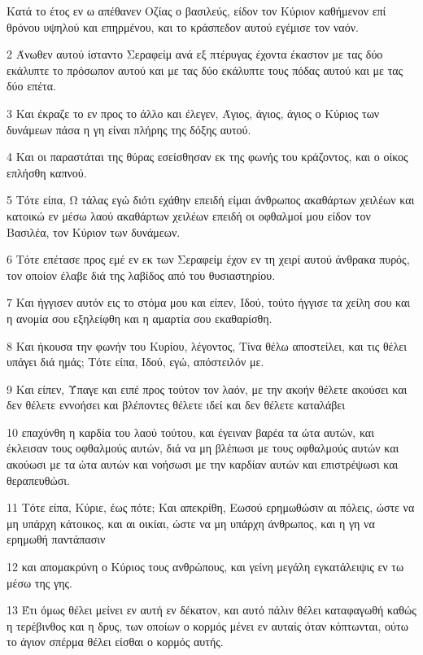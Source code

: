 \par Κατά το έτος εν ω απέθανεν Οζίας ο βασιλεύς, είδον τον Κύριον καθήμενον επί θρόνου υψηλού και επηρμένου, και το κράσπεδον αυτού εγέμισε τον ναόν.
\par 2 Άνωθεν αυτού ίσταντο Σεραφείμ ανά εξ πτέρυγας έχοντα έκαστον με τας δύο εκάλυπτε το πρόσωπον αυτού και με τας δύο εκάλυπτε τους πόδας αυτού και με τας δύο επέτα.
\par 3 Και έκραζε το εν προς το άλλο και έλεγεν, Άγιος, άγιος, άγιος ο Κύριος των δυνάμεων πάσα η γη είναι πλήρης της δόξης αυτού.
\par 4 Και οι παραστάται της θύρας εσείσθησαν εκ της φωνής του κράζοντος, και ο οίκος επλήσθη καπνού.
\par 5 Τότε είπα, Ω τάλας εγώ διότι εχάθην επειδή είμαι άνθρωπος ακαθάρτων χειλέων και κατοικώ εν μέσω λαού ακαθάρτων χειλέων επειδή οι οφθαλμοί μου είδον τον Βασιλέα, τον Κύριον των δυνάμεων.
\par 6 Τότε επέτασε προς εμέ εν εκ των Σεραφείμ έχον εν τη χειρί αυτού άνθρακα πυρός, τον οποίον έλαβε διά της λαβίδος από του θυσιαστηρίου.
\par 7 Και ήγγισεν αυτόν εις το στόμα μου και είπεν, Ιδού, τούτο ήγγισε τα χείλη σου και η ανομία σου εξηλείφθη και η αμαρτία σου εκαθαρίσθη.
\par 8 Και ήκουσα την φωνήν του Κυρίου, λέγοντος, Τίνα θέλω αποστείλει, και τις θέλει υπάγει διά ημάς; Τότε είπα, Ιδού, εγώ, απόστειλόν με.
\par 9 Και είπεν, Ύπαγε και ειπέ προς τούτον τον λαόν, με την ακοήν θέλετε ακούσει και δεν θέλετε εννοήσει και βλέποντες θέλετε ιδεί και δεν θέλετε καταλάβει
\par 10 επαχύνθη η καρδία του λαού τούτου, και έγειναν βαρέα τα ώτα αυτών, και έκλεισαν τους οφθαλμούς αυτών, διά να μη βλέπωσι με τους οφθαλμούς αυτών και ακούωσι με τα ώτα αυτών και νοήσωσι με την καρδίαν αυτών και επιστρέψωσι και θεραπευθώσι.
\par 11 Τότε είπα, Κύριε, έως πότε; Και απεκρίθη, Εωσού ερημωθώσιν αι πόλεις, ώστε να μη υπάρχη κάτοικος, και αι οικίαι, ώστε να μη υπάρχη άνθρωπος, και η γη να ερημωθή παντάπασιν
\par 12 και απομακρύνη ο Κύριος τους ανθρώπους, και γείνη μεγάλη εγκατάλειψις εν τω μέσω της γης.
\par 13 Έτι όμως θέλει μείνει εν αυτή εν δέκατον, και αυτό πάλιν θέλει καταφαγωθή καθώς η τερέβινθος και η δρυς, των οποίων ο κορμός μένει εν αυταίς όταν κόπτωνται, ούτω το άγιον σπέρμα θέλει είσθαι ο κορμός αυτής.

